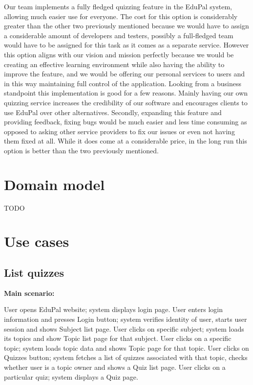 \documentclass[
    english, %
]{VUMIFPSkursinis}
\begin{document}
Our team implements a fully fledged quizzing feature in the EduPal system, allowing much easier use for everyone. The cost for this option is considerably greater than the other two previously mentioned because we would have to assign a considerable amount of developers and testers, possibly a full-fledged team would have to be assigned for this task as it comes as a separate service. However this option aligns with our vision and mission perfectly because we would be creating an effective learning environment while also having the ability to improve the feature, and we would be offering our personal services to users and in this way maintaining full control of the application. Looking from a business standpoint this implementation is good for a few reasons. Mainly having our own quizzing service increases the credibility of our software and encourages clients to use EduPal over other alternatives. Secondly, expanding this feature and providing feedback, fixing bugs would be much easier and less time consuming as opposed to asking other service providers to fix our issues or even not having them fixed at all. While it does come at a considerable price, in the long run this option is better than the two previously mentioned.

\section{Domain model}

TODO

\section{Use cases}

\subsection{List quizzes}

\noindent\textbf{\fontsize{13}{15}\selectfont Main scenario:}

User opens EduPal website; system displays login page. User enters login information and presses Login button; system verifies identity of user, starts user session and shows Subject list page. User clicks on specific subject; system loads its topics and show Topic list page for that subject. User clicks on a specific topic; system loads topic data and shows Topic page for that topic. User clicks on Quizzes button; system fetches a list of quizzes associated with that topic, checks whether user is a topic owner and shows a Quiz list page. User clicks on a particular quiz; system displays a Quiz page.
\end{document}
